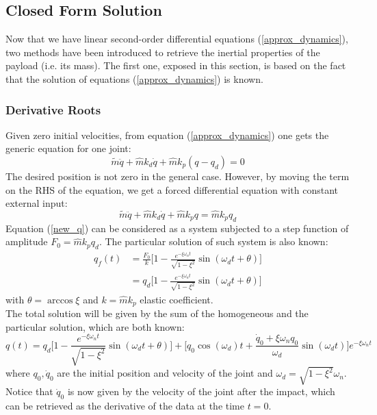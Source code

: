 \documentclass[a4paper,12pt,oneside]{report}
\begin{document}
\subsection{Closed Form Solution}
Now that we have linear second-order differential equations (\ref{approx_dynamics}), two methods have been introduced to retrieve the inertial properties of the payload (i.e. its mass). The first one, exposed in this section, is based on the fact that the solution of equations (\ref{approx_dynamics}) is known.
\subsubsection{Derivative Roots}
Given zero initial velocities, from equation (\ref{approx_dynamics}) one gets the generic equation for one joint:
\begin{equation}
  \tilde{m}\ddot{q}+\hat{m}k_d\dot{q}+\hat{m}k_p (q-q_d)=0
\end{equation}
The desired position is not zero in the general case. However, by moving the term on the RHS of the equation, we get a forced differential equation with constant external input:
\begin{equation}
  \tilde{m}\ddot{q}+\hat{m}k_d\dot{q}+\hat{m}k_p q=\hat{m}k_pq_d
  \label{new_q}
\end{equation}
Equation (\ref{new_q}) can be considered as a system subjected to a step function of amplitude $F_0=\hat{m}k_pq_d$. The particular solution of such system is also known:
\begin{equation}
  \begin{split}
  q_f(t)&=\frac{F_0}{k}\Big[1-\frac{e^{-\xi\omega_nt}}{\sqrt{1-\xi^2}}\sin{(\omega_dt+\theta)}\Big]\\
  &=q_d\Big[1-\frac{e^{-\xi\omega_nt}}{\sqrt{1-\xi^2}}\sin{(\omega_dt+\theta)}\Big]
\end{split}
\end{equation}
with $\theta=\arccos{\xi}$ and $k=\hat{m}k_p$ elastic coefficient.\\
The total solution will be given by the sum of the homogeneous and the particular solution, which are both known:
\begin{equation}
  q(t)=q_d\Big[1-\frac{e^{-\xi\omega_nt}}{\sqrt{1-\xi^2}}\sin{(\omega_dt+\theta)}\Big]+\Big[q_0\cos{(\omega_d)t}+\frac{\dot{q}_0+\xi\omega_n q_0}{\omega_d}\sin{(\omega_dt)}\Big]e^{-\xi \omega_n t}
  \label{closed_form}
\end{equation}
where $q_0,\dot{q}_0$ are the initial position and velocity of the joint and $\omega_d=\sqrt{1-\xi^2}\omega_n$. Notice that $\dot{q}_0$ is now given by the velocity of the joint after the impact, which can be retrieved as the derivative of the data at the time $t=0$.\\
\end{document}
